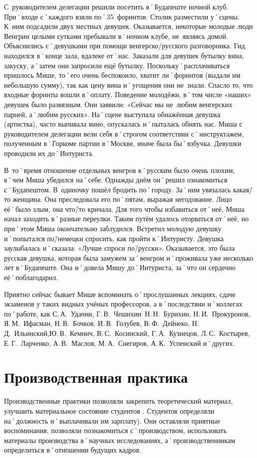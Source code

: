 С~руководителем делегации решили посетить в˚Будапеште ночной клуб. При˚входе с˚каждого взяли по˚35~форинтов. Столик разместили у˚сцены. К~ним подсадили двух местных девушек. Оказывается, некоторые молодые люди Венгрии целыми сутками пребывали в˚ночном клубе, не~являясь домой. Объяснились с˚девушками при помощи венгерско\-/русского разговорника. Гид находился в˚конце зала, вдалеке от˚нас. Заказали для девушек бутылку вина, закуску, а˚затем они запросили ещё бутылку. Поскольку˚расплачиваться пришлось Мише, то˚его очень беспокоило, хватит ли˚форинтов (выдали им небольшую сумму), так как цену вина и˚угощения они не~знали. Спасло то, что входные форинты вошли в˚оплату. Поведение молодёжи, в˚том числе «наших» девушек было развязным. Они заявили: «Сейчас мы не~любим венгерских парней, а˚любим русских». На˚сцене выступала обнажённая девушка (артистка), часто выпивала вино, опускалась и˚пыталась обнять нас. Миша с руководителем делегации вели себя в˚строгом соответствии с˚инструктажем, полученным в˚Горкоме партии в˚Москве, иначе была бы˚взбучка. Девушки проводили их до˚Интуриста. 

В~то˚время отношение отдельных венгров к˚русским было очень плохим, в˚чем Миша убедился на˚себе.
Однажды днём он˚решил ознакомиться с˚Будапештом. В~одиночку пошёл бродить по˚городу. За˚ним увязалась какая\=/то женщина. Она преследовала его по˚пятам, выражая негодование. Лицо её˚было злым, она что\=/то кричала. Для того чтобы избавиться от˚неё, Миша начал заходить в˚разные переулки. Таким путём удалось оторваться от˚неё, но при˚этом Миша окончательно заблудился. Встретил молодую девушку и˚попытался по\=/немецки спросить, как пройти к˚Интуристу. Девушка заулыбалась и˚сказала: «Лучше спроси по\=/русски». Оказывается, это была русская девушка, которая была замужем за˚венгром и˚проживала уже несколько лет в˚Будапеште. Она и˚довела Мишу до˚Интуриста, за˚что он сердечно её˚поблагодарил. 

Приятно сейчас бывает Мише вспоминать о˚прослушанных лекциях, сдаче экзаменов у таких видных учёных профессоров, а в˚последствии и˚коллегах по˚работе, как С.\,А.~Удачин, Г.\,В.~Чешихин\, Н.\,Н.~Бурихин, Н.\,И.~Прокуронов, Я.\,М.~Ифасман, Н.\,В.~Бочков, И.\,В.~Голубев, В.\,Ф.~Дейнеко, Н.\,Д.~Ильинский,Ю.\,В.~Кемнич, В.\,С.~Косинский, Г.\,А.~Кузнецов, Л.\,С.~Костырев, Е.\,Г.~Ларченко, А.\,В.~Маслов, М.\,А.~Снегиров, А.\,К.~Успенский и˚других.


\section*{Производственная практика}
\label{sec:productionPractices}
Производственные практики позволяли закрепить теоретический материал, улучшить материальное состояние студентов . Студентов определяли на˚должность и˚выплачивали им зарплату). Они оставляли приятные воспоминания, позволяли познакомиться с˚производством, использовать материалы производства в˚научных исследованиях, а˚производственникам определиться в˚отношении будущих кадров.

